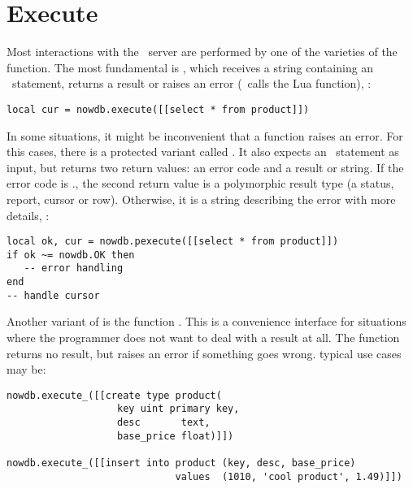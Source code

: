 
\section{Execute}
Most interactions with the \nowdb\ server
are performed by one of the varieties of
the  function.
The most fundamental is ,
which receives a string containing an \sql\ statement,
returns a result or raises an error (\ie\ calls
the Lua  function), \eg:

\begin{lua}
\begin{lstlisting}
local cur = nowdb.execute([[select * from product]])
\end{lstlisting}
\end{lua}

In some situations, it might be inconvenient
that a function raises an error.
For this cases, there is a protected
variant called .
It also expects an \sql\ statement
as input, but returns two return values:
an error code and a result or string.
If the error code is .,
the second return value
is a polymorphic result type
(a status, report, cursor or row).
Otherwise, it is a string describing
the error with more details, \eg:

\begin{lua}
\begin{lstlisting}
local ok, cur = nowdb.pexecute([[select * from product]])
if ok ~= nowdb.OK then
   -- error handling
end
-- handle cursor
\end{lstlisting}
\end{lua}

Another variant of  is
the function .
This is a convenience interface for
situations where the programmer does
not want to deal with a result at all.
The function returns no result, but
raises an error if something goes wrong.
typical use cases may be:

\begin{lua}
\begin{lstlisting}
nowdb.execute_([[create type product(
                   key uint primary key,
                   desc       text,
                   base_price float)]])

nowdb.execute_([[insert into product (key, desc, base_price)
                             values  (1010, 'cool product', 1.49)]])
\end{lstlisting}
\end{lua}


